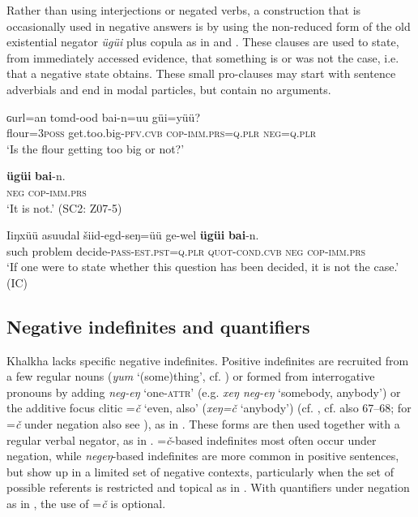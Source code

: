 \documentclass[output=paper,colorlinks,citecolor=brown,chinesefont]{langscibook}
\begin{document}
Rather than using interjections or negated verbs, a construction that is occasionally used in negative answers is by using the non-reduced form of the old existential negator \textit{ügüi} plus copula as in  and . These clauses are used to state, from immediately accessed evidence, that something is or was not the case, i.e. that a negative state obtains. These small pro-clauses may start with sentence adverbials and end in modal particles, but contain no arguments.

\ea\label{ex:kha:58}
    \begin{xlist}
    \label{ex:kha:58a}
        \gll ɢurl=an tomd-ood bai-n=uu güi=yüü? \\ 
             flour=3\textsc{poss} get.too.big-\textsc{pfv.cvb} \textsc{cop-imm.prs=q.plr} \textsc{neg=q.plr} \\
        \glt ‘Is the flour getting too big or not?’
    
    \label{ex:kha:58b}
        \gll  \textbf{ügüi} \textbf{bai}-n. \\
             \textsc{neg} \textsc{cop-imm.prs} \\
        \glt ‘It is not.’ (SC2: Z07-5)
    \end{xlist}
\z

\ea\label{ex:kha:59}
    \gll Iiŋxüü   asuudal šiid-egd-seŋ=üü ge-wel  \textbf{ügüi} \textbf{bai}-n. \\
         such problem decide-\textsc{pass-est.pst=q.plr} \textsc{quot-cond.cvb} \textsc{neg} \textsc{cop-imm.prs}\\
    \glt ‘If one were to state whether this question has been decided, it is not the case.’ (IC)
\z 
  \label{bkm:Ref12913}\textit{} 


\subsection{Negative indefinites and quantifiers}\label{sec:kha:3.2}

Khalkha lacks specific negative indefinites. Positive indefinites are recruited from a few regular nouns (\textit{yum} ‘(some)thing’, cf. ) or formed from interrogative pronouns by adding \textit{neg-eŋ} ‘one-\textsc{attr}’ (e.g. \textit{xeŋ neg-eŋ} ‘somebody, anybody’) or the additive focus clitic =\textit{č} ‘even, also’ (\textit{xeŋ=č} ‘anybody’) (cf. \citealt[132--133]{Janhunen2012}, cf. also 67--68; for =\textit{č} under negation also see \citealt{Hashimoto2009}), %
as in . These forms are then used together with a regular verbal negator, as in . =\textit{č}{}-based indefinites most often occur under negation, while \textit{negeŋ}{}-based indefinites are more common in positive sentences, but show up in a limited set of negative contexts, particularly when the set of possible referents is restricted and topical as in . With quantifiers under negation as in , the use of =\textit{č} is optional. 
\end{document}
